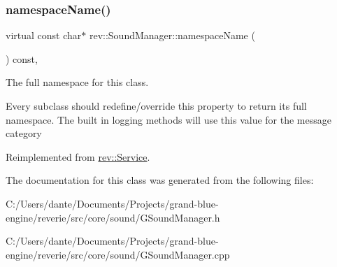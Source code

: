 \mbox{\label{classrev_1_1_sound_manager_a00de07c95c3a3993ec7c2008cc2c0db3}} 
\subsubsection{\texorpdfstring{namespaceName()}{namespaceName()}}
{\footnotesize\ttfamily virtual const char$\ast$ rev\+::\+Sound\+Manager\+::namespace\+Name (\begin{DoxyParamCaption}{ }\end{DoxyParamCaption}) const\hspace{0.3cm}{\ttfamily [inline]}, {\ttfamily [virtual]}}



The full namespace for this class. 

Every subclass should redefine/override this property to return its full namespace. The built in logging methods will use this value for the message category 

Reimplemented from \mbox{\hyperlink{classrev_1_1_service_a831f5bf8c53584ec830aaee38ea58e7b}{rev\+::\+Service}}.



The documentation for this class was generated from the following files\+:\begin{DoxyCompactItemize}
\item 
C\+:/\+Users/dante/\+Documents/\+Projects/grand-\/blue-\/engine/reverie/src/core/sound/G\+Sound\+Manager.\+h\item 
C\+:/\+Users/dante/\+Documents/\+Projects/grand-\/blue-\/engine/reverie/src/core/sound/G\+Sound\+Manager.\+cpp\end{DoxyCompactItemize}
